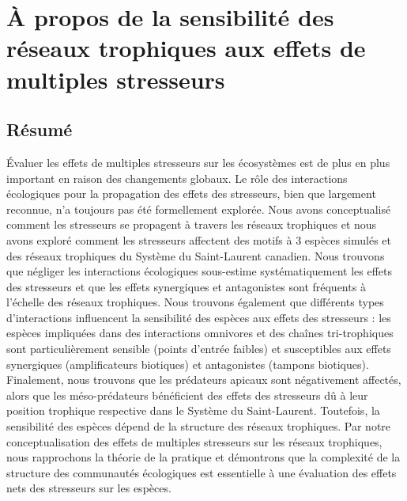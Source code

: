 \chapter{À propos de la sensibilité des réseaux trophiques aux effets de multiples stresseurs}
\label{chap1}

\section{Résumé}

Évaluer les effets de multiples stresseurs sur les écosystèmes est de plus en plus important en raison des changements globaux. Le rôle des interactions écologiques pour la propagation des effets des stresseurs, bien que largement reconnue, n’a toujours pas été formellement explorée. Nous avons conceptualisé comment les stresseurs se propagent à travers les réseaux trophiques et nous avons exploré comment les stresseurs affectent des motifs à 3 espèces simulés et des réseaux trophiques du Système du Saint-Laurent canadien. Nous trouvons que négliger les interactions écologiques sous-estime systématiquement les effets des stresseurs et que les effets synergiques et antagonistes sont fréquents à l’échelle des réseaux trophiques. Nous trouvons également que différents types d’interactions influencent la sensibilité des espèces aux effets des stresseurs : les espèces impliquées dans des interactions omnivores et des chaînes tri-trophiques sont particulièrement sensible (points d’entrée faibles) et susceptibles aux effets synergiques (amplificateurs biotiques) et antagonistes (tampons biotiques). Finalement, nous trouvons que les prédateurs apicaux sont négativement affectés, alors que les méso-prédateurs bénéficient des effets des stresseurs dû à leur position trophique respective dans le Système du Saint-Laurent. Toutefois, la sensibilité des espèces dépend de la structure des réseaux trophiques. Par notre conceptualisation des effets de multiples stresseurs sur les réseaux trophiques, nous rapprochons la théorie de la pratique et démontrons que la complexité de la structure des communautés écologiques est essentielle à une évaluation des effets nets des stresseurs sur les espèces.

